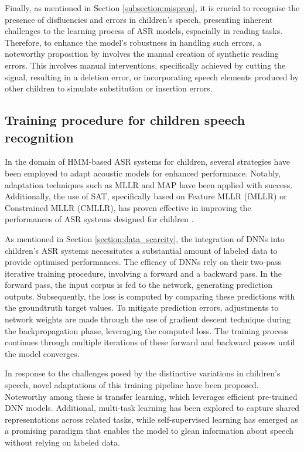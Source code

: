 Finally, as mentioned in Section \ref{subsection:mispron}, it is crucial to recognise the presence of disfluencies and errors in children's speech, presenting inherent challenges to the learning process of \ac{ASR} models, espacially in reading tasks. Therefore, to enhance the model's robustness in handling such errors, a noteworthy proposition by \cite{gelin2021simulating} involves the manual creation of synthetic reading errors. This involves manual interventions, specifically achieved by cutting the signal, resulting in a deletion error, or incorporating speech elements produced by other children to simulate substitution or insertion errors.


\subsection{Training procedure for children speech recognition}%

In the domain of \ac{HMM}-based \ac{ASR} systems for children, several strategies have been employed to adapt acoustic models for enhanced performance. Notably, adaptation techniques such as \ac{MLLR} and \ac{MAP} have been applied with success. Additionally, the use of \ac{SAT}, specifically based on Feature \ac{MLLR} (fMLLR) or Constrained \ac{MLLR} (CMLLR), has proven effective in improving the performances of \ac{ASR} systems designed for children \cite{pronunciation, asr-improved2, children_language_model2, reviewASRchildren}.

As mentioned in Section \ref{section:data_scarcity}, the integration of DNNs into children's \ac{ASR} systems necessitates a substantial amount of labeled data to  provide optimised performances. The efficacy of \acp{DNN} rely on their two-pass iterative training procedure, involving a forward and a backward pass. In the forward pass, the input corpus is fed to the network, generating prediction outputs. Subsequently, the loss is computed by comparing these predictions with the groundtruth target values. To mitigate prediction errors, adjustments to network weights are made through the use of gradient descent technique during the backpropagation phase, leveraging the computed loss. The training process continues through multiple iterations of these forward and backward passes until the model converges.

In response to the challenges posed by the distinctive variations in children's speech, novel adaptations of this training pipeline have been proposed. Noteworthy among these is transfer learning, which leverages efficient pre-trained \ac{DNN} models. Additional, multi-task learning has been explored to capture shared representations across related tasks, while self-supervised learning has emerged as a promising paradigm that enables the model to glean information about speech without relying on labeled data.


